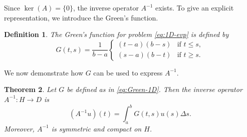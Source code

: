 \documentclass{article}
\newtheorem{theorem}{Theorem}[section]
\newtheorem{definition}[theorem]{Definition}
\newtheorem{remark}[theorem]{Remark}
\numberwithin{equation}{section}
\numberwithin{theorem}{section}
\begin{document}
\noindent Since $\ker(A) = \{0\}$, the inverse operator $A^{-1}$ exists. To give an explicit representation, we introduce the Green's function.

\begin{definition}\label{def:Green}
The Green's function for problem \eqref{eq:1D-evp} is defined by
\begin{equation}\label{eq:Green-1D}
G(t,s) = \frac{1}{b-a} \begin{cases}
(t-a)(b-s) & \text{if } t \leq s,\\
(s-a)(b-t) & \text{if } t \geq s.
\end{cases}
\end{equation}
\end{definition}

We now demonstrate how $G$ can be used to express $A^{-1}$.
\begin{theorem}\label{thm:A-inverse}
Let $G$ be defined as in \eqref{eq:Green-1D}. Then the inverse operator $A^{-1}\colon H \to D$ is
\begin{equation}\label{eq:A-inverse-rep}
\left(A^{-1}u\right)(t) = \int_a^b G(t,s) u(s) \Delta s.
\end{equation}
Moreover, $A^{-1}$ is symmetric and compact on $H$.
\end{theorem}
\end{document}
